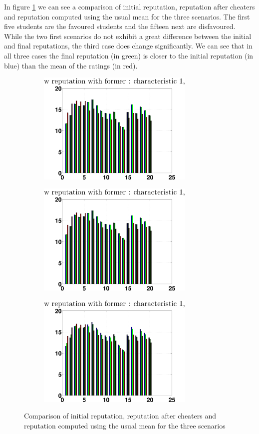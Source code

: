\documentclass[12pt,a4paper]{article}
\begin{document}
In figure \ref{finalCheat} we can see a comparison of initial reputation, reputation after cheaters and reputation computed using the usual mean for the three scenarios. The first five students are the favoured students and the fifteen next are disfavoured. While the two first scenarios do not exhibit a great difference between the initial and final reputations, the third case does change significantly. We can see that in all three cases the final reputation (in green) is closer to the initial reputation (in blue) than the mean of the ratings (in red).
\begin{figure}
\centering
\begin{subfigure}[b]{0.49\textwidth}
\includegraphics[width = 7.5cm]{cheaters/chcompareRepStupidc1.eps}
\end{subfigure}
\begin{subfigure}[b]{0.49\textwidth}
\includegraphics[width = 7.5cm]{cheaters/chcompareRepSmartc1.eps}
\end{subfigure}
\begin{subfigure}[b]{0.49\textwidth}
\includegraphics[width = 7.5cm]{cheaters/chcompareRepMixc1.eps}
\end{subfigure}
\caption{\label{finalCheat}Comparison of initial reputation, reputation after cheaters and reputation computed using the usual mean for the three scenarios}
\end{figure}
\end{document}
